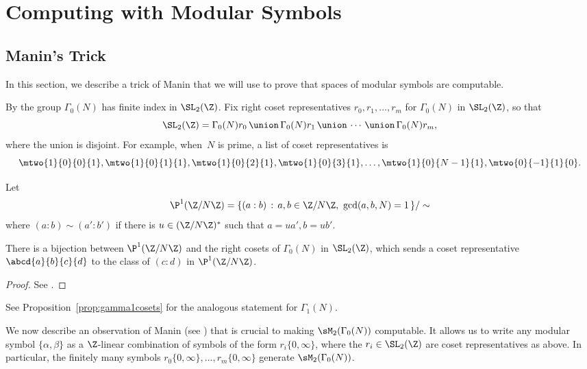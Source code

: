 \section{Computing with Modular Symbols}
\subsection{Manin's Trick}\label{sec:manintrick}
In this section, we describe a trick of Manin that we will use to
prove that spaces of modular symbols are computable.

By  the 
group $\Gamma_0(N)$ has finite index in $\SL_2(\Z)$.
Fix right coset representatives 
$r_0, r_1, \ldots, r_m$ for
$\Gamma_0(N)$ in $\SL_2(\Z)$, so that
$$\SL_2(\Z) = \Gamma_0(N)r_0 \, \union\, \Gamma_0(N)r_1 \, \union\, 
   \cdots \, \union\, \Gamma_0(N)r_m,$$
where the union is disjoint.
For example, when~$N$ is prime, a list of coset representatives is
 $$\mtwo{1}{0}{0}{1}, 
   \mtwo{1}{0}{1}{1},
   \mtwo{1}{0}{2}{1},
   \mtwo{1}{0}{3}{1},
\ldots,
   \mtwo{\hfill 1}{0}{N-1}{1},
   \mtwo{0}{-1}{1}{\hfill 0}.$$

Let 
\begin{equation}\label{eqn:p1znz}
   \P^1(\Z/N\Z)= \{(a:b) \,: \, a,b\in\Z/N\Z,  \, \,\gcd(a,b,N)=1  \,\}/\sim
 \end{equation}
where $(a:b)\sim (a':b')$ if there is $u\in(\Z/N\Z)^*$ such
that $a=ua', b=ub'$.

\begin{proposition}\label{prop:p1bij}
There is a bijection between $\P^1(\Z/N\Z)$ and the 
right cosets of $\Gamma_0(N)$ in $\SL_2(\Z)$, which
sends a coset representative $\abcd{a}{b}{c}{d}$ 
to the class of $(c:d)$ in $\P^1(\Z/N\Z)$.
\end{proposition}
\begin{proof}
See .
\end{proof}
See Proposition~\ref{prop:gamma1cosets} for the
analogous statement for $\Gamma_1(N)$.


We now describe an observation of Manin (see
\cite[\S1.5]{manin:parabolic}) that is crucial to making
$\sM_2(\Gamma_0(N))$ computable.  It allows us to write any modular
symbol $\{\alpha, \beta\}$ as a $\Z$-linear combination of symbols of
the form $r_i\{0,\infty\}$, where the $r_i\in \SL_2(\Z)$ are coset
representatives as above.  In particular, the finitely many symbols
$r_0\{0,\infty\}, \ldots, r_m\{0,\infty\}$ generate
$\sM_2(\Gamma_0(N))$.

